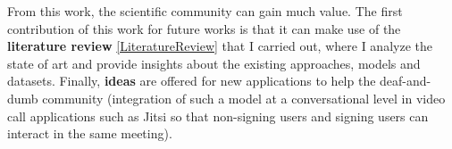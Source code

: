 From this work, the scientific community can gain much value. 
The first contribution of this work for future works is that it can make use of the \textbf{literature review} \ref{LiteratureReview} that I carried out, where I analyze 
the state of art and provide insights about the existing approaches, models and datasets.
Finally, \textbf{ideas} are offered for new applications to help the deaf-and-dumb community (integration of such a model at a conversational 
level in video call applications such as Jitsi \cite{Jitsi} so that non-signing users and signing users can interact in the same meeting).